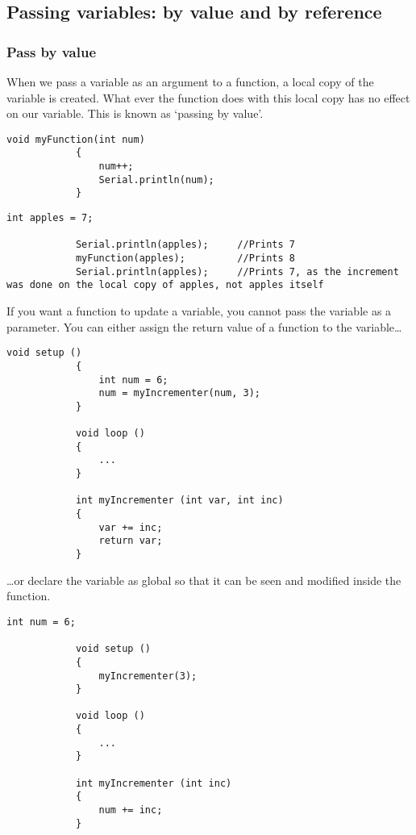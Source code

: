 \documentclass{article}
\begin{document}
	\subsection{Passing variables: by value and by reference}

		\subsubsection{Pass by value}

			When we pass a variable as an argument to a function, a local copy of the variable is created. What ever the function does with this local copy has no effect on our variable. This is known as `passing by value'.

			\begin{lstlisting}[gobble=12]
			void myFunction(int num)
			{
				num++;
				Serial.println(num);
			}
			\end{lstlisting}

			\begin{lstlisting}[gobble=12]
			int apples = 7;

			Serial.println(apples);		//Prints 7
			myFunction(apples);			//Prints 8
			Serial.println(apples);		//Prints 7, as the increment was done on the local copy of apples, not apples itself
			\end{lstlisting}

			If you want a function to update a variable, you cannot pass the variable as a parameter. You can either assign the return value of a function to the variable\ldots

			\begin{lstlisting}[gobble=12]
			void setup ()
			{
				int num = 6;
				num = myIncrementer(num, 3);
			}

			void loop ()
			{
				...
			}

			int myIncrementer (int var, int inc)
			{
				var += inc;
				return var;
			}
			\end{lstlisting}

			\ldots{}or declare the variable as global so that it can be seen and modified inside the function.

			\begin{lstlisting}[gobble=12]
			int num = 6;
			
			void setup ()
			{
				myIncrementer(3);
			}

			void loop ()
			{
				...
			}

			int myIncrementer (int inc)
			{
				num += inc;
			}
			\end{lstlisting}
\end{document}
